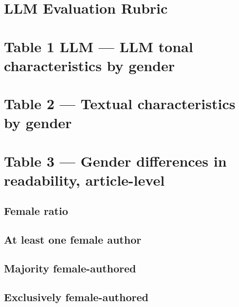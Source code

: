 \documentclass[12pt]{article}
\begin{document}
\section{LLM Evaluation Rubric}

\clearpage

\section{Table 1 LLM --- LLM tonal characteristics by gender}

\clearpage

\section{Table 2 --- Textual characteristics by gender}

\clearpage

\section{Table 3 --- Gender differences in readability, article-level}

\subsection{Female ratio}

\clearpage

\subsection{At least one female author}

\clearpage

\subsection{Majority female-authored}

\clearpage

\subsection{Exclusively female-authored}

\clearpage
\end{document}
